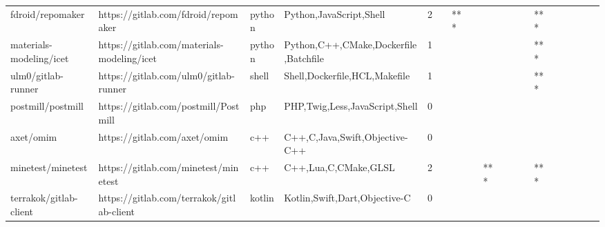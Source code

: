 \begin{tabular}{llllrlllllllllllll}
fdroid/repomaker                                   &                https://gitlab.com/fdroid/repomaker &            python &                            Python,JavaScript,Shell &       2 &         &    *** &           &                &                 &        &           &       *** &          &          &       &              &          \\
materials-modeling/icet                            &         https://gitlab.com/materials-modeling/icet &            python &              Python,C++,CMake,Dockerfile,Batchfile &       1 &         &        &           &                &                 &        &           &       *** &          &          &       &              &          \\
ulm0/gitlab-runner                                 &              https://gitlab.com/ulm0/gitlab-runner &             shell &                      Shell,Dockerfile,HCL,Makefile &       1 &         &        &           &                &                 &        &           &       *** &          &          &       &              &          \\
postmill/postmill                                  &               https://gitlab.com/postmill/Postmill &               php &                     PHP,Twig,Less,JavaScript,Shell &       0 &         &        &           &                &                 &        &           &           &          &          &       &              &          \\
axet/omim                                          &                       https://gitlab.com/axet/omim &               c++ &                     C++,C,Java,Swift,Objective-C++ &       0 &         &        &           &                &                 &        &           &           &          &          &       &              &          \\
minetest/minetest                                  &               https://gitlab.com/minetest/minetest &               c++ &                               C++,Lua,C,CMake,GLSL &       2 &         &        &           &            *** &                 &        &           &       *** &          &          &       &              &          \\
terrakok/gitlab-client                             &          https://gitlab.com/terrakok/gitlab-client &            kotlin &                      Kotlin,Swift,Dart,Objective-C &       0 &         &        &           &                &                 &        &           &           &          &          &       &              &          \\

\end{tabular}

